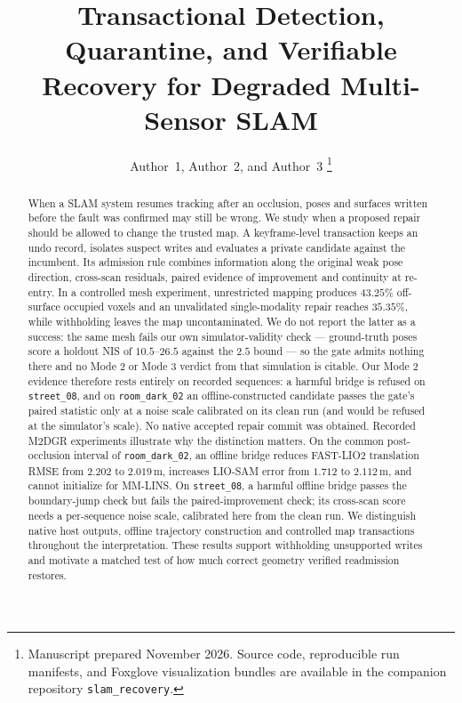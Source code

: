 \documentclass[journal]{IEEEtran}
\begin{document}
\title{Transactional Detection, Quarantine, and Verifiable Recovery for Degraded Multi-Sensor SLAM}

\author{Author~1, Author~2, and Author~3%
\thanks{Manuscript prepared November 2026. Source code, reproducible run manifests, and Foxglove visualization bundles are available in the companion repository \texttt{slam\_recovery}.}}

\maketitle

\begin{abstract}
When a SLAM system resumes tracking after an occlusion, poses and surfaces written before the fault was confirmed may still be wrong. We study when a proposed repair should be allowed to change the trusted map. A keyframe-level transaction keeps an undo record, isolates suspect writes and evaluates a private candidate against the incumbent. Its admission rule combines information along the original weak pose direction, cross-scan residuals, paired evidence of improvement and continuity at re-entry. In a controlled mesh experiment, unrestricted mapping produces $43.25\%$ off-surface occupied voxels and an unvalidated single-modality repair reaches $35.35\%$, while withholding leaves the map uncontaminated. We do not report the latter as a success: the same mesh fails our own simulator-validity check --- ground-truth poses score a holdout NIS of $10.5$--$26.5$ against the $2.5$ bound --- so the gate admits nothing there and no Mode 2 or Mode 3 verdict from that simulation is citable. Our Mode 2 evidence therefore rests entirely on recorded sequences: a harmful bridge is refused on \texttt{street\_08}, and on \texttt{room\_dark\_02} an offline-constructed candidate passes the gate's paired statistic only at a noise scale calibrated on its clean run (and would be refused at the simulator's scale). No native accepted repair commit was obtained. Recorded M2DGR experiments illustrate why the distinction matters. On the common post-occlusion interval of \texttt{room\_dark\_02}, an offline bridge reduces FAST-LIO2 translation RMSE from $2.202$ to $2.019$\,m, increases LIO-SAM error from $1.712$ to $2.112$\,m, and cannot initialize for MM-LINS. On \texttt{street\_08}, a harmful offline bridge passes the boundary-jump check but fails the paired-improvement check; its cross-scan score needs a per-sequence noise scale, calibrated here from the clean run. We distinguish native host outputs, offline trajectory construction and controlled map transactions throughout the interpretation. These results support withholding unsupported writes and motivate a matched test of how much correct geometry verified readmission restores.
\end{abstract}
\end{document}
